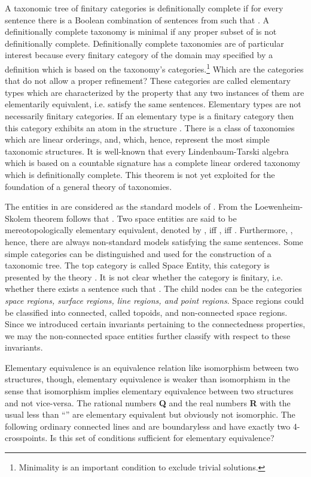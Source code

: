 \documentclass{ao2e}
\begin{document}
{A taxonomic tree  of finitary categories is definitionally complete if for every sentence  there is
a Boolean combination  of sentences from  such that .
A definitionally complete taxonomy  is minimal if any proper subset of  is not definitionally complete.
Definitionally complete taxonomies are of particular interest because every finitary category of the domain
may specified by a definition which is based on the taxonomy's categories.\footnote{Minimality is an important condition to exclude trivial solutions.} Which are the categories that do not allow a proper refinement? These categories are called elementary types which are characterized by the property that any two instances of them are elementarily equivalent, i.e. satisfy the same sentences. Elementary types are not necessarily finitary categories. If an elementary type is a finitary category then this category exhibits
an atom in the structure . There is a class of taxonomies which are linear orderings, and, which, hence, represent the most simple taxonomic structures. It is well-known that every Lindenbaum-Tarski algebra  which is based on a countable signature has a complete linear ordered taxonomy which is definitionally complete. This theorem is not yet exploited for  the foundation of a general theory of taxonomies.

The entities in  are considered as the standard models of . From the Loewenheim-Skolem theorem follows that 
 .
Two space entities  are said to be mereotopologically elementary equivalent, denoted by
, iff , iff .
Furthermore, , hence, there are always non-standard models
satisfying the same sentences. Some simple categories can be distinguished and used for the construction of a taxonomic tree. The top category is called Space Entity, this category is presented by the theory .
It is not clear whether the category  is finitary, i.e. whether there exists a sentence 
such that .
The child nodes can be the categories {\it space regions, surface regions,
line regions, and point regions}. Space regions could be classified into connected, called topoids, and non-connected
space regions. Since we introduced certain invariants pertaining to the connectedness properties, we may the non-connected space entities further classify with respect to these invariants. 


Elementary equivalence is an equivalence relation like isomorphism between two structures, though, elementary equivalence is weaker than isomorphism in the sense that isomorphism implies elementary equivalence between two structures and not vice-versa. The rational numbers \textbf{Q} and the real numbers \textbf{R} with the usual less than ``'' are elementary equivalent but obviously not isomorphic. 
The following ordinary connected lines  and  are boundaryless and have exactly two 4-crosspoints. Is this set of conditions sufficient for elementary equivalence?

}
\end{document}
